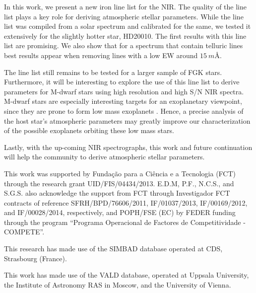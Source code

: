 \documentclass{aa}
\begin{document}
In this work, we present a new iron line list for the NIR. The quality
of the line list plays a key role for deriving atmospheric stellar
parameters. While the line list was compiled from a solar spectrum and
calibrated for the same, we tested it extensively for the slightly
hotter star, HD20010. The first results with this line list are
promising. We also show that for a spectrum that contain telluric
lines best results appear when removing lines with a low EW around
$\SI{15}{m\angstrom}$.

The line list still remains to be tested for a larger sample of FGK
stars. Furthermore, it will be interesting to explore the use of this
line list to derive parameters for M-dwarf stars using high resolution
and high S/N NIR spectra. M-dwarf stars are especially interesting
targets for an exoplanetary viewpoint, since they are prone to form
low mass exoplanets \citep{Bonfils2013}. Hence, a precise analysis
of the host star's atmospheric parameters may greatly improve our
characterization of the possible exoplanets orbiting these low mass
stars.

Lastly, with the up-coming NIR spectrographs, this work and future
continuation will help the community to derive atmospheric stellar
parameters.





\begin{acknowledgements}

This work was supported by Funda\c{c}\~ao para a Ci\^encia e a
Tecnologia (FCT) through the research grant UID/FIS/04434/2013.
E.D.M, P.F., N.C.S., and S.G.S. also acknowledge the support from FCT
through Investigador FCT contracts of reference SFRH/BPD/76606/2011,
IF/01037/2013, IF/00169/2012, and IF/00028/2014, respectively, and
POPH/FSE (EC) by FEDER funding through the program “Programa
Operacional de Factores de Competitividade - COMPETE”.

This research has made use of the SIMBAD database operated at CDS,
Strasbourg (France).

This work has made use of the VALD database, operated at Uppsala
University, the Institute of Astronomy RAS in Moscow, and the University
of Vienna.

\end{acknowledgements}








\end{document}
